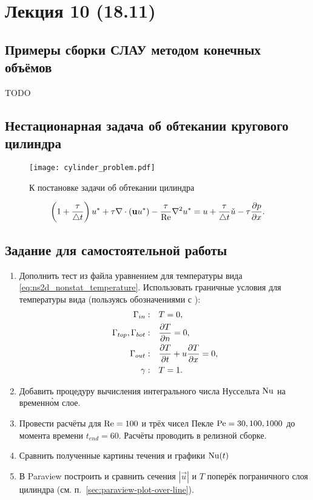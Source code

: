 \section{Лекция 10 (18.11)}
\subsection{Примеры сборки СЛАУ методом конечных объёмов}
TODO
\subsection{Нестационарная задача об обтекании кругового цилиндра}
\begin{figure}[h!]
\centering
\texttt{[image: cylinder\_problem.pdf]}
\caption{К постановке задачи об обтекании цилиндра}
\label{fig:cylinder-problem}

\end{figure}
\begin{equation}
\label{eq:ustar_fvm}
\left(1 + \frac{\tau}{\triangle t}\right) u^* + \tau \nabla\cdot(\boldsymbol{\rm u} u^*) - \frac{\tau}{\mathrm{Re}}\nabla^2 u^* = u + \frac{\tau}{\triangle t} \check u - \tau \frac{\partial p}{\partial x}.
\end{equation}


\subsection{Задание для самостоятельной работы}
\begin{enumerate}
\item
Дополнить тест  из файла 
уравнением для температуры вида \cref{eq:ns2d_nonstat_temperature}.
Использовать граничные условия для температуры вида (пользуясь обозначениями с ):
\begin{equation*}
\begin{aligned}
\Gamma_{in}:                &\quad T = 0,\\
\Gamma_{top}, \Gamma_{bot}: &\quad \frac{\partial T}{\partial n} = 0, \\
\Gamma_{out}:               &\quad \frac{\partial T}{\partial t} + u\frac{\partial T}{\partial x} = 0,\\
\gamma:                     &\quad T = 1. \\
\end{aligned}
\end{equation*}
\item
Добавить процедуру вычисления интегрального числа Нуссельта $\mathrm{Nu}$ на временн\`{о}м слое.
\item
Провести расчёты для $\mathrm{Re}=100$ и трёх чисел Пекле $\mathrm{Pe} = 30, 100, 1000$ до момента времени $t_{end} = 60$. Расчёты
проводить в релизной сборке.
\item
Сравнить полученные картины течения и графики $\mathrm{Nu}(t)$
\item
В Paraview построить и сравнить сечения $|\vec u|$ и $T$ поперёк пограничного слоя цилиндра (см. п.~\ref{sec:paraview-plot-over-line}).
\end{enumerate}

